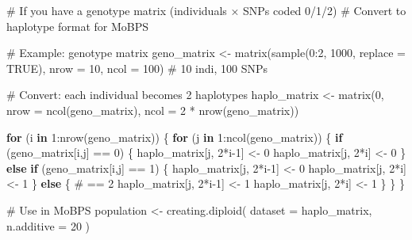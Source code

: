\documentclass[
  letterpaper,
]{book}
\newenvironment{Shaded}{\begin{snugshade}}{\end{snugshade}}
\newcommand{\AttributeTok}[1]{\textcolor[rgb]{0.40,0.45,0.13}{#1}}
\newcommand{\CommentTok}[1]{\textcolor[rgb]{0.37,0.37,0.37}{#1}}
\newcommand{\ConstantTok}[1]{\textcolor[rgb]{0.56,0.35,0.01}{#1}}
\newcommand{\ControlFlowTok}[1]{\textcolor[rgb]{0.00,0.23,0.31}{\textbf{#1}}}
\newcommand{\DecValTok}[1]{\textcolor[rgb]{0.68,0.00,0.00}{#1}}
\newcommand{\FunctionTok}[1]{\textcolor[rgb]{0.28,0.35,0.67}{#1}}
\newcommand{\NormalTok}[1]{\textcolor[rgb]{0.00,0.23,0.31}{#1}}
\newcommand{\OtherTok}[1]{\textcolor[rgb]{0.00,0.23,0.31}{#1}}
\newcommand{\SpecialCharTok}[1]{\textcolor[rgb]{0.37,0.37,0.37}{#1}}
\begin{document}
\begin{Shaded}
\begin{Highlighting}[]
\CommentTok{\# If you have a genotype matrix (individuals × SNPs coded 0/1/2)}
\CommentTok{\# Convert to haplotype format for MoBPS}

\CommentTok{\# Example: genotype matrix}
\NormalTok{geno\_matrix }\OtherTok{\textless{}{-}} \FunctionTok{matrix}\NormalTok{(}\FunctionTok{sample}\NormalTok{(}\DecValTok{0}\SpecialCharTok{:}\DecValTok{2}\NormalTok{, }\DecValTok{1000}\NormalTok{, }\AttributeTok{replace =} \ConstantTok{TRUE}\NormalTok{),}
                      \AttributeTok{nrow =} \DecValTok{10}\NormalTok{, }\AttributeTok{ncol =} \DecValTok{100}\NormalTok{)  }\CommentTok{\# 10 indi, 100 SNPs}

\CommentTok{\# Convert: each individual becomes 2 haplotypes}
\NormalTok{haplo\_matrix }\OtherTok{\textless{}{-}} \FunctionTok{matrix}\NormalTok{(}\DecValTok{0}\NormalTok{, }\AttributeTok{nrow =} \FunctionTok{ncol}\NormalTok{(geno\_matrix), }\AttributeTok{ncol =} \DecValTok{2} \SpecialCharTok{*} \FunctionTok{nrow}\NormalTok{(geno\_matrix))}

\ControlFlowTok{for}\NormalTok{ (i }\ControlFlowTok{in} \DecValTok{1}\SpecialCharTok{:}\FunctionTok{nrow}\NormalTok{(geno\_matrix)) \{}
  \ControlFlowTok{for}\NormalTok{ (j }\ControlFlowTok{in} \DecValTok{1}\SpecialCharTok{:}\FunctionTok{ncol}\NormalTok{(geno\_matrix)) \{}
    \ControlFlowTok{if}\NormalTok{ (geno\_matrix[i,j] }\SpecialCharTok{==} \DecValTok{0}\NormalTok{) \{}
\NormalTok{      haplo\_matrix[j, }\DecValTok{2}\SpecialCharTok{*}\NormalTok{i}\DecValTok{{-}1}\NormalTok{] }\OtherTok{\textless{}{-}} \DecValTok{0}
\NormalTok{      haplo\_matrix[j, }\DecValTok{2}\SpecialCharTok{*}\NormalTok{i] }\OtherTok{\textless{}{-}} \DecValTok{0}
\NormalTok{    \} }\ControlFlowTok{else} \ControlFlowTok{if}\NormalTok{ (geno\_matrix[i,j] }\SpecialCharTok{==} \DecValTok{1}\NormalTok{) \{}
\NormalTok{      haplo\_matrix[j, }\DecValTok{2}\SpecialCharTok{*}\NormalTok{i}\DecValTok{{-}1}\NormalTok{] }\OtherTok{\textless{}{-}} \DecValTok{0}
\NormalTok{      haplo\_matrix[j, }\DecValTok{2}\SpecialCharTok{*}\NormalTok{i] }\OtherTok{\textless{}{-}} \DecValTok{1}
\NormalTok{    \} }\ControlFlowTok{else}\NormalTok{ \{  }\CommentTok{\# == 2}
\NormalTok{      haplo\_matrix[j, }\DecValTok{2}\SpecialCharTok{*}\NormalTok{i}\DecValTok{{-}1}\NormalTok{] }\OtherTok{\textless{}{-}} \DecValTok{1}
\NormalTok{      haplo\_matrix[j, }\DecValTok{2}\SpecialCharTok{*}\NormalTok{i] }\OtherTok{\textless{}{-}} \DecValTok{1}
\NormalTok{    \}}
\NormalTok{  \}}
\NormalTok{\}}

\CommentTok{\# Use in MoBPS}
\NormalTok{population }\OtherTok{\textless{}{-}} \FunctionTok{creating.diploid}\NormalTok{(}
  \AttributeTok{dataset =}\NormalTok{ haplo\_matrix,}
  \AttributeTok{n.additive =} \DecValTok{20}
\NormalTok{)}
\end{Highlighting}
\end{Shaded}
\end{document}
